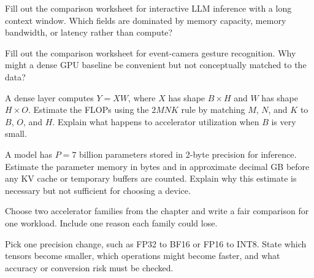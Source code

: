 \begin{exercises}
\item Fill out the comparison worksheet for interactive LLM inference with a long context window. Which fields are dominated by memory capacity, memory bandwidth, or latency rather than compute?
\item Fill out the comparison worksheet for event-camera gesture recognition. Why might a dense GPU baseline be convenient but not conceptually matched to the data?
\item A dense layer computes \(Y = XW\), where \(X\) has shape \(B \times H\) and \(W\) has shape \(H \times O\). Estimate the FLOPs using the \(2M N K\) rule by matching \(M\), \(N\), and \(K\) to \(B\), \(O\), and \(H\). Explain what happens to accelerator utilization when \(B\) is very small.
\item A model has \(P=7\) billion parameters stored in 2-byte precision for inference. Estimate the parameter memory in bytes and in approximate decimal GB before any KV cache or temporary buffers are counted. Explain why this estimate is necessary but not sufficient for choosing a device.
\item Choose two accelerator families from the chapter and write a fair comparison for one workload. Include one reason each family could lose.
\item Pick one precision change, such as FP32 to BF16 or FP16 to INT8. State which tensors become smaller, which operations might become faster, and what accuracy or conversion risk must be checked.
\end{exercises}
